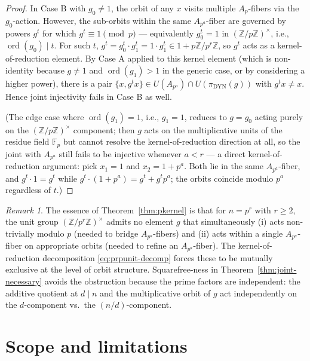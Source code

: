 \documentclass[11pt,reqno]{amsart}
\theoremstyle{plain}
\theoremstyle{definition}
\theoremstyle{remark}
\newtheorem{remark}[theorem]{Remark}
\DeclareMathOperator{\ord}{ord}
\DeclareMathOperator{\dyn}{DYN}
\newcommand{\Z}{\mathbb{Z}}
\newcommand{\F}{\mathbb{F}}
\begin{document}
\begin{proof}
In Case B with $g_{0} \ne 1$, the orbit of any $x$ visits multiple
$A_{p}$-fibers via the $g_{0}$-action. However, the sub-orbits within
the same $A_{p^{a}}$-fiber are governed by powers $g^{t}$ for which
$g^{t} \equiv 1 \pmod{p}$ --- equivalently $g_{0}^{t} = 1$ in
$(\Z/p\Z)^{\times}$, i.e., $\ord(g_{0}) \mid t$. For such $t$,
$g^{t} = g_{0}^{t} \cdot g_{1}^{t} = 1 \cdot g_{1}^{t} \in
1 + p\Z/p^{r}\Z$, so $g^{t}$ acts as a kernel-of-reduction element.
By Case A applied to this kernel element (which is non-identity
because $g \ne 1$ and $\ord(g_{1}) > 1$ in the generic case, or by
considering a higher power), there is a pair $\{x, g^{t} x\} \in
U(A_{p^{a}}) \cap U(\pi_{\dyn}(g))$ with $g^{t} x \ne x$. Hence joint
injectivity fails in Case B as well.

(The edge case where $\ord(g_{1}) = 1$, i.e., $g_{1} = 1$, reduces
to $g = g_{0}$ acting purely on the $(\Z/p\Z)^{\times}$ component;
then $g$ acts on the multiplicative units of the residue field
$\F_{p}$ but cannot resolve the kernel-of-reduction direction at all,
so the joint with $A_{p^{a}}$ still fails to be injective whenever
$a < r$ --- a direct kernel-of-reduction argument: pick $x_{1} = 1$
and $x_{2} = 1 + p^{a}$. Both lie in the same $A_{p^{a}}$-fiber, and
$g^{t} \cdot 1 = g^{t}$ while $g^{t} \cdot (1 + p^{a}) = g^{t} +
g^{t} p^{a}$; the orbits coincide modulo $p^{a}$ regardless of $t$.)
\end{proof}

\begin{remark}\label{rem:pkernel-essence}
The essence of Theorem~\ref{thm:pkernel} is that for $n = p^{r}$ with
$r \ge 2$, the unit group $(\Z/p^{r}\Z)^{\times}$ admits no element
$g$ that simultaneously (i) acts non-trivially modulo $p$ (needed to
bridge $A_{p^{a}}$-fibers) and (ii) acts within a single
$A_{p^{a}}$-fiber on appropriate orbits (needed to refine an
$A_{p^{a}}$-fiber). The kernel-of-reduction decomposition
\eqref{eq:prpunit-decomp} forces these to be mutually exclusive at
the level of orbit structure. Squarefree-ness in
Theorem~\ref{thm:joint-necessary} avoids the obstruction because the
prime factors are independent: the additive quotient at $d \mid n$
and the multiplicative orbit of $g$ act independently on the
$d$-component vs.\ the $(n/d)$-component.
\end{remark}

\section{Scope and limitations}\label{sec:scope}
\end{document}
